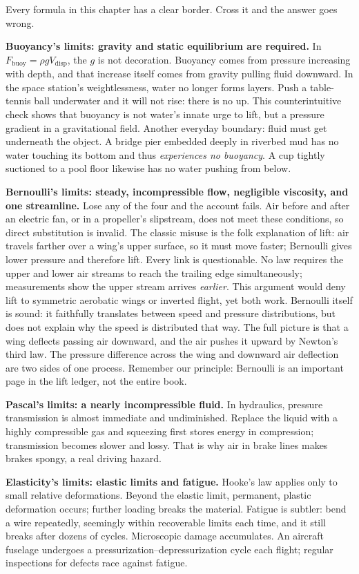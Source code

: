 
\begin{mainline}
Every formula in this chapter has a clear border. Cross it and the answer goes wrong.

\textbf{Buoyancy's limits: gravity and static equilibrium are required.} In \(F_{\text{buoy}}=\rho g V_{\text{disp}}\), the \(g\) is not decoration. Buoyancy comes from pressure increasing with depth, and that increase itself comes from gravity pulling fluid downward. In the space station's weightlessness, water no longer forms layers. Push a table-tennis ball underwater and it will not rise: there is no up. This counterintuitive check shows that buoyancy is not water's innate urge to lift, but a pressure gradient in a gravitational field. Another everyday boundary: fluid must get underneath the object. A bridge pier embedded deeply in riverbed mud has no water touching its bottom and thus \emph{experiences no buoyancy}. A cup tightly suctioned to a pool floor likewise has no water pushing from below.

\textbf{Bernoulli's limits: steady, incompressible flow, negligible viscosity, and one streamline.} Lose any of the four and the account fails. Air before and after an electric fan, or in a propeller's slipstream, does not meet these conditions, so direct substitution is invalid. The classic misuse is the folk explanation of lift: air travels farther over a wing's upper surface, so it must move faster; Bernoulli gives lower pressure and therefore lift. Every link is questionable. No law requires the upper and lower air streams to reach the trailing edge simultaneously; measurements show the upper stream arrives \emph{earlier}. This argument would deny lift to symmetric aerobatic wings or inverted flight, yet both work. Bernoulli itself is sound: it faithfully translates between speed and pressure distributions, but does not explain why the speed is distributed that way. The full picture is that a wing deflects passing air downward, and the air pushes it upward by Newton's third law. The pressure difference across the wing and downward air deflection are two sides of one process. Remember our principle: Bernoulli is an important page in the lift ledger, not the entire book.

\textbf{Pascal's limits: a nearly incompressible fluid.} In hydraulics, pressure transmission is almost immediate and undiminished. Replace the liquid with a highly compressible gas and squeezing first stores energy in compression; transmission becomes slower and lossy. That is why air in brake lines makes brakes spongy, a real driving hazard.

\textbf{Elasticity's limits: elastic limits and fatigue.} Hooke's law applies only to small relative deformations. Beyond the elastic limit, permanent, plastic deformation occurs; further loading breaks the material. Fatigue is subtler: bend a wire repeatedly, seemingly within recoverable limits each time, and it still breaks after dozens of cycles. Microscopic damage accumulates. An aircraft fuselage undergoes a pressurization--depressurization cycle each flight; regular inspections for defects race against fatigue.
\end{mainline}

